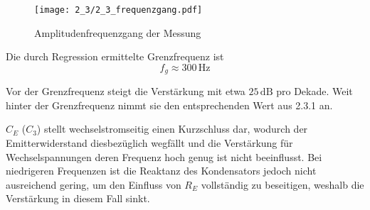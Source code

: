 \begin{figure}[H]
  \begin{center}
    \texttt{[image: 2\_3/2\_3\_frequenzgang.pdf]}
  \end{center}
  \caption{Amplitudenfrequenzgang der Messung}
\end{figure}

Die durch Regression ermittelte Grenzfrequenz ist
\[f_g \approx 300 \, \si{\hertz}\]

Vor der Grenzfrequenz steigt die Verstärkung mit etwa $25 \, \si{\deci\bel}$ pro
Dekade. Weit hinter der Grenzfrequenz nimmt sie den entsprechenden Wert aus
2.3.1 an.

$C_E$ ($C_3$) stellt wechselstromseitig einen Kurzschluss dar, wodurch der
Emitterwiderstand diesbezüglich wegfällt und die Verstärkung für 
Wechselspannungen deren Frequenz hoch genug ist nicht beeinflusst. Bei
niedrigeren Frequenzen ist die Reaktanz des Kondensators jedoch nicht
ausreichend gering, um den Einfluss von $R_E$ vollständig zu beseitigen, weshalb
die Verstärkung in diesem Fall sinkt.

